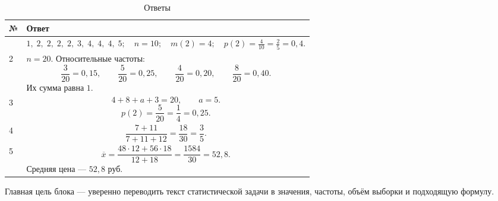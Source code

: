 \documentclass[a4paper,12pt]{article}
\begin{document}
\begin{table}[ht]
\centering
\caption{Ответы}
\begin{tabularx}{\linewidth}{>{\centering\arraybackslash}p{18mm} X}
\toprule
№ & Ответ \\
\midrule

1 &
\(
1,\;2,\;2,\;2,\;2,\;3,\;4,\;4,\;4,\;5;
\quad
n=10;
\quad
m(2)=4;
\quad
p(2)=\frac{4}{10}=\frac25=0{,}4.
\)
\\

\addlinespace[2mm]

2 &
\(
n=20.
\)
Относительные частоты:
\[
\frac{3}{20}=0{,}15,\qquad
\frac{5}{20}=0{,}25,\qquad
\frac{4}{20}=0{,}20,\qquad
\frac{8}{20}=0{,}40.
\]
Их сумма равна \(1\).
\\

\addlinespace[2mm]

3 &
\[
4+8+a+3=20,
\qquad
a=5.
\]
\[
p(2)=\frac{5}{20}=\frac14=0{,}25.
\]
\\

\addlinespace[2mm]

4 &
\[
\frac{7+11}{7+11+12}
=
\frac{18}{30}
=
\frac35.
\]
\\

\addlinespace[2mm]

5 &
\[
\overline{x}
=
\frac{48\cdot12+56\cdot18}{12+18}
=
\frac{1584}{30}
=
52{,}8.
\]
Средняя цена --- \(52{,}8\) руб.
\\

\bottomrule
\end{tabularx}
\end{table}

\vfill

\begin{center}
{\color{softgray}\small
Главная цель блока --- уверенно переводить текст статистической задачи
в значения, частоты, объём выборки и подходящую формулу.
}
\end{center}
\end{document}
